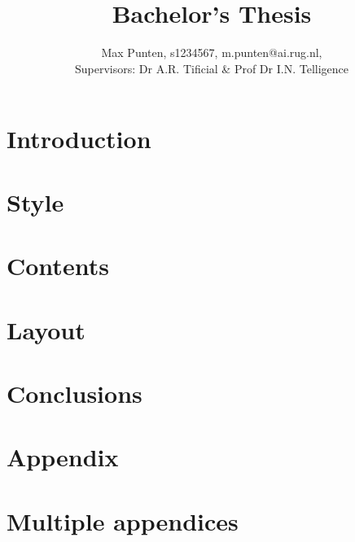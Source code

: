 \documentclass[10pt,a4paper,twocolumn]{article}
\title{\vspace{-0.5in}{\bfseries\scshape 
    Bachelor's thesis Template - Title of project
    } \\ 
    \vspace{1ex} 
    \normalsize{Bachelor's Thesis}\vspace{-2ex}
}
\author{
    \normalsize{Max Punten, s1234567, m.punten@ai.rug.nl,} \\ 
    \normalsize{Supervisors: Dr A.R. Tificial \& Prof Dr I.N. Telligence}
}
\date{\vspace{-5ex}}
\begin{document}
\twocolumn[
  \maketitle
  \begin{@twocolumnfalse}
    
  \end{@twocolumnfalse}
]

\thispagestyle{firststyle}

\section{Introduction}\label{sec:introduction}


\section{Style}\label{sec:style}


\section{Contents}\label{sec:contents}


\section{Layout}\label{sec:layout}


\section{Conclusions}\label{sec:conclusions}





\clearpage

\begin{appendices}
    \section{Appendix}\label{ap:appendix}
    
    \newpage
    \section{Multiple appendices}\label{ap:appendices}
    
    \newpage
\end{appendices}
\end{document}
